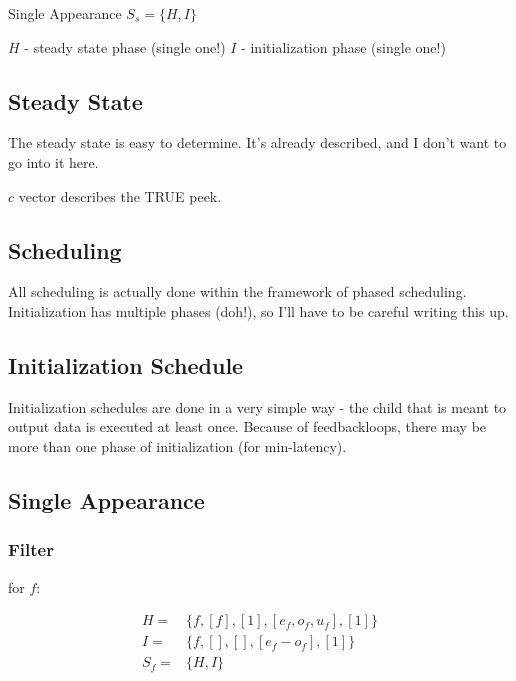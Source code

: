 \noindent Single Appearance $S_s = \{H, I\}$
\begin{itemize}
\myitem $H$ - steady state phase (single one!) \myitem $I$ -
initialization phase (single one!)
\end{itemize}

\subsection{Steady State}

The steady state is easy to determine.  It's already described,
and I don't want to go into it here.

$c$ vector describes the TRUE peek.

\subsection{Scheduling}

All scheduling is actually done within the framework of phased
scheduling.  Initialization has multiple phases (doh!), so I'll
have to be careful writing this up.


\subsection{Initialization Schedule}

Initialization schedules are done in a very simple way - the child
that is meant to output data is executed at least once.  Because
of feedbackloops, there may be more than one phase of
initialization (for min-latency).

\subsection{Single Appearance}

\subsubsection{Filter}

for {\filter} $f$:

\begin{displaymath}
\begin{array}{rl}
H = & \{f, [f], [1], [e_f, o_f, u_f], [1]\} \\
I = & \{f, [], [], [e_f - o_f], [1]\} \\
S_f = & \{H, I\}
\end{array}
\end{displaymath}

